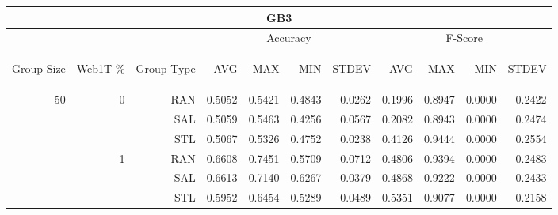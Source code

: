 \begin{center}
\begin{table}[htbp]
\begin{tabular}{ | r | r | r | r | r | r | r | r | r | r | r |}
\hline
\multicolumn{11}{|c|}{GB3}\\
\hline
 & & & \multicolumn{4}{|c|}{Accuracy} & \multicolumn{4}{|c|}{F-Score}\\ \cline{4-11}
\begin{sideways}Group Size\end{sideways} & \begin{sideways}Web1T \%\end{sideways} & \begin{sideways}Group Type\end{sideways} & \begin{sideways}AVG\end{sideways} & \begin{sideways}MAX\end{sideways} & \begin{sideways}MIN\end{sideways} & \begin{sideways}STDEV\end{sideways} & \begin{sideways}AVG\end{sideways} & \begin{sideways}MAX\end{sideways} & \begin{sideways}MIN\end{sideways} & \begin{sideways}STDEV\end{sideways}\\
\hline
\multirow{18}{*}{50}
 & \multirow{3}{*}{0} & RAN & 0.5052 & 0.5421 & 0.4843 & 0.0262 & 0.1996 & 0.8947 & 0.0000 & 0.2422\\ \cline{3-11}
 &   & SAL & 0.5059 & 0.5463 & 0.4256 & 0.0567 & 0.2082 & 0.8943 & 0.0000 & 0.2474\\ \cline{3-11}
 &   & STL & 0.5067 & 0.5326 & 0.4752 & 0.0238 & 0.4126 & 0.9444 & 0.0000 & 0.2554\\ \cline{2-11}
 & \multirow{3}{*}{1} & RAN & 0.6608 & 0.7451 & 0.5709 & 0.0712 & 0.4806 & 0.9394 & 0.0000 & 0.2483\\ \cline{3-11}
 &   & SAL & 0.6613 & 0.7140 & 0.6267 & 0.0379 & 0.4868 & 0.9222 & 0.0000 & 0.2433\\ \cline{3-11}
 &   & STL & 0.5952 & 0.6454 & 0.5289 & 0.0489 & 0.5351 & 0.9077 & 0.0000 & 0.2158\\ \cline{2-11}

\end{tabular}
\end{table}
\end{center}

